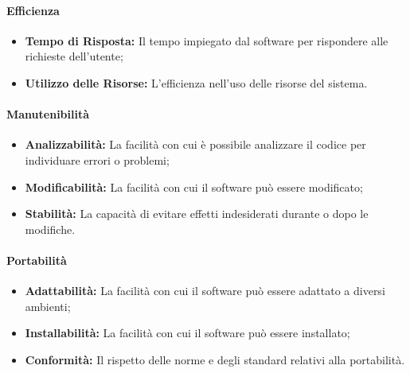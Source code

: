 \paragraph{Efficienza}
\begin{itemize}
    \item \textbf{Tempo di Risposta:} Il tempo impiegato dal software per rispondere alle richieste dell'utente;
    \item \textbf{Utilizzo delle Risorse:} L'efficienza nell'uso delle risorse del sistema.
\end{itemize}

\paragraph{Manutenibilità}
\begin{itemize}
    \item \textbf{Analizzabilità:} La facilità con cui è possibile analizzare il codice per individuare errori o problemi;
    \item \textbf{Modificabilità:} La facilità con cui il software può essere modificato;
    \item \textbf{Stabilità:} La capacità di evitare effetti indesiderati durante o dopo le modifiche.
\end{itemize}

\paragraph{Portabilità}
\begin{itemize}
    \item \textbf{Adattabilità:} La facilità con cui il software può essere adattato a diversi ambienti;
    \item \textbf{Installabilità:} La facilità con cui il software può essere installato;
    \item \textbf{Conformità:} Il rispetto delle norme e degli standard relativi alla portabilità.
\end{itemize}




